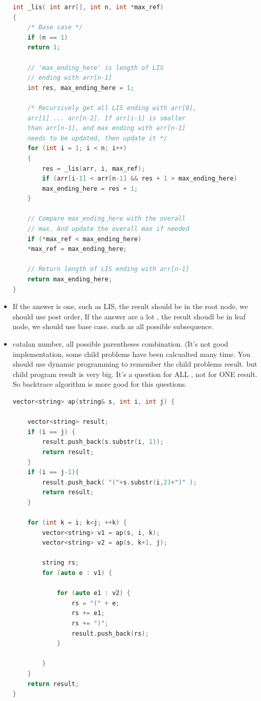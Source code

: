 \documentclass[a4paper,11pt,twoside]{book}
\begin{document}
\begin{itemize}
\begin{lstlisting}[frame=single, language=c++]
int _lis( int arr[], int n, int *max_ref)
{
	/* Base case */
	if (n == 1)
	return 1;
	
	// 'max_ending_here' is length of LIS
	// ending with arr[n-1]
	int res, max_ending_here = 1;
	
	/* Recursively get all LIS ending with arr[0],
	arr[1] ... arr[n-2]. If arr[i-1] is smaller
	than arr[n-1], and max ending with arr[n-1]
	needs to be updated, then update it */
	for (int i = 1; i < n; i++)
	{
		res = _lis(arr, i, max_ref);
		if (arr[i-1] < arr[n-1] && res + 1 > max_ending_here)
		max_ending_here = res + 1;
	}
	
	// Compare max_ending_here with the overall
	// max. And update the overall max if needed
	if (*max_ref < max_ending_here)
	*max_ref = max_ending_here;
	
	// Return length of LIS ending with arr[n-1]
	return max_ending_here;
}
\end{lstlisting}


	\item If the answer is one, such as LIS, the result should be in the root node, we should use post order, If the answer are a lot , the result shoudl be in leaf node, we should use base case. such as all possible subsequence. 

\item catalan number, all possible parentheses combination. (It's not good implementation, some child problems have been calcualted many time.  You should use dynamic programming to remember the child problems result. but child program result is very big.  It's a question for ALL , not for ONE result. So backtrace algorithm is more good for this questions. 
\begin{lstlisting}[frame=single, language=c++]
vector<string> ap(string& s, int i, int j) {
	
	vector<string> result;
	if (i == j) {
		result.push_back(s.substr(i, 1));
		return result;
	}
	if (i == j-1){
		result.push_back( "("+s.substr(i,2)+")" );
		return result;
	}
	
	for (int k = i; k<j; ++k) {
		vector<string> v1 = ap(s, i, k);
		vector<string> v2 = ap(s, k+1, j);
		
		string rs;
		for (auto e : v1) {
			
			for (auto e1 : v2) {
				rs = "(" + e;
				rs += e1;
				rs += ")";
				result.push_back(rs);
			}
			
		}
	}
	return result;
}	
\end{lstlisting}


\end{itemize}
\end{document}

